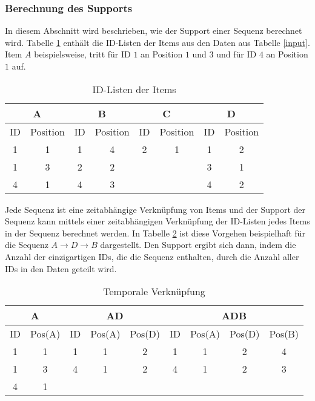 \subsubsection*{Berechnung des Supports}
In diesem Abschnitt wird beschrieben, wie der Support einer Sequenz berechnet wird. Tabelle \ref{idlist} enthält die ID-Listen der Items aus den Daten aus Tabelle \ref{input}. Item $A$ beispielsweise, tritt für ID $1$ an Position $1$ und $3$ und für ID $4$ an Position $1$ auf.\\
\begin{table}[H]
\centering
\begin{tabular}{c|c|c|c|c|c|c|c}
\multicolumn{2}{c|}{A} & \multicolumn{2}{c|}{B} & \multicolumn{2}{c|}{C} & \multicolumn{2}{c}{D} \\ \hline
ID & Position  & ID & Position  & ID & Position  & ID & Position  \\ \hline
1	 & 1				 & 1  & 4				  & 2  & 1				 & 1  & 2 \\
1  & 3				 & 2  &	2			    &    &  				 & 3  & 1 \\
4  & 1				 & 4  &	3			    &    &  				 & 4  & 2 
\end{tabular}
\caption{ID-Listen der Items}\label{idlist}
\end{table}
Jede Sequenz ist eine zeitabhängige Verknüpfung von Items und der Support der Sequenz kann mittels einer zeitabhängigen Verknüpfung der ID-Listen jedes Items in der Sequenz berechnet werden. In Tabelle \ref{tempjoin} ist diese Vorgehen beispielhaft für die Sequenz $A\rightarrow D\rightarrow B$ dargestellt. Den Support ergibt sich dann, indem die Anzahl der einzigartigen IDs, die die Sequenz enthalten, durch die Anzahl aller IDs in den Daten geteilt wird.\\
\begin{table}[H]
\centering
\begin{tabular}{c|c||c|c|c||c|c|c|c}
\multicolumn{2}{c||}{A} & \multicolumn{3}{c||}{AD} & \multicolumn{4}{c}{ADB} \\ \hline \hline
ID & Pos(A) 	    		  & ID & Pos(A) & Pos(D) 		 & ID & Pos(A) & Pos(D) & Pos(B) \\ \hline
1  & 1									& 1  & 1			& 2          & 1  & 1			 & 2      & 4 \\
1  & 3									& 4  & 1      & 2          & 4  & 1      & 2      & 3 \\
4  & 1									& 	 & 				&            & 	  & 			 &        &	
\end{tabular}
\caption{Temporale Verknüpfung}\label{tempjoin}
\end{table}
